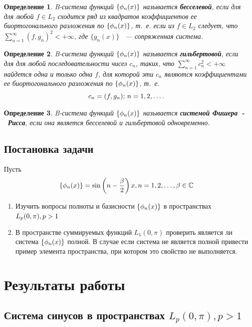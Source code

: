 \documentclass[oneside, final, 14pt]{extreport}
\newtheorem{definition}{Определение}
\begin{document}
\begin{definition}
	B-система функций $\{\phi_n(x)\}$ называется \textbf{бесселевой}, если для для любой $f \in L_2$ сходится ряд из квадратов
	коэффициентов ее биортогонального разложения по $\{\phi_n(x)\}$, т.~е. если из $f \in L_2$ следует, что \\
	$\sum\limits^\infty_{n = 1}(f, g_n)^2 < +\infty$, где $\{g_n(x)\}$ ~--- сопряженная система.
\end{definition}

\begin{definition}
	B-система функций $\{\phi_n(x)\}$ называется \textbf{гильбертовой}, если для для любой последовательности чисел
	$c_n$, таких, что $\sum\limits^\infty_{n = 1}c_n^2 < + \infty$ найдется одна и только одна $f$, для которой эти $c_n$
	являются коэффициентами ее биортогонального разложения по $\{\phi_n(x)\}$, т.~е.
	$$c_n = (f, g_n); \thinspace n = 1, 2, \ldots.$$
\end{definition}

\begin{definition}
	B-система функций $\{\phi_n(x)\}$ называется \textbf{системой Фишера~-~Рисса}, если она является бесселевой и гильбертовой 
	одновременно.
\end{definition}

\newpage	
\section{Постановка задачи}
Пусть $$\{\phi_n(x)\} = \sin\left(n - \frac{\beta}{2}\right)x, n = 1, 2, \dots,  \beta\in\mathbb{C}$$
\begin{enumerate}
	\item Изучить вопросы полноты и базисности $\{\phi_n(x)\}$ в пространствах $L_p(0, \pi),\\ p > 1$
	\item В пространстве суммируемых функций $L_1(0, \pi)$ проверить является ли система $\{\phi_n(x)\}$ полной.
	В случае если система не является полной привести пример элемента пространства, при котором это свойство не выполняется.
\end{enumerate}


\chapter*{Результаты работы}
\begin{raggedright}
\section{Система синусов в пространствах $L_p(0, \pi), p > 1$}
\end{raggedright}
\end{document}
